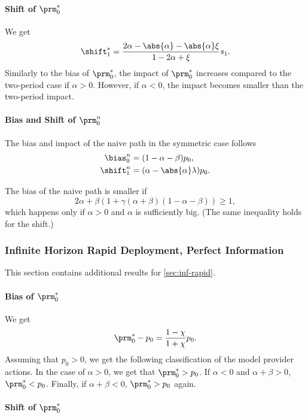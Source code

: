 \paragraph{Shift of $\prm^*_0$}

We get
\[
    \shift^*_1 = \frac{2 \alpha - \abs{\alpha} - \abs{\alpha} \xi}{1 - 2
    \alpha + \xi} s_1.
\]
Similarly to the bias of $\prm^*_0$, the impact of $\prm^*_0$ increases
compared to the two-period case if $\alpha > 0$. However, if $\alpha < 0$, the
impact becomes smaller than the two-period impact.

\paragraph{Bias and Shift of $\prm^n_0$}

The bias and impact of the naive path in the symmetric case follows
\[
    \begin{split}
        \bias^n_0 &= (1 - \alpha - \beta) p_0,\\
        \shift^n_1 &= (\alpha - \abs{\alpha} \lambda) p_0.
    \end{split}
\]

The bias of the naive path is smaller if
\[
    2 \alpha + \beta (1 + \gamma (\alpha + \beta) (1 - \alpha - \beta)) \ge 1,
\]
which happens only if $\alpha > 0$ and $\alpha$ is sufficiently big. (The same
inequality holds for the shift.)

\subsubsection{Infinite Horizon Rapid Deployment, Perfect Information}

This section contains additional results for \cref{sec:inf-rapid}.

\paragraph{Bias of $\prm^*_0$}

We get
\[
    \prm^*_0 - p_0 = \frac{1 - \chi}{1 + \chi} p_0.
\]
Assuming that $p_0 > 0$, we get the following classification of the model
provider actions. In the case of $\alpha > 0$, we get that $\prm^*_0 > p_0$. If
$\alpha < 0$ and $\alpha + \beta > 0$, $\prm^*_0 < p_0$. Finally, if $\alpha +
\beta < 0$, $\prm^*_0 > p_0$ again.

\paragraph{Shift of $\prm^*_0$}

